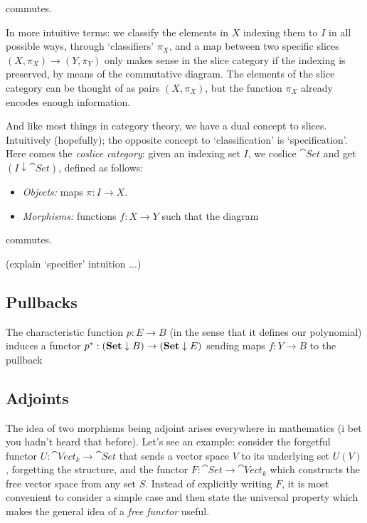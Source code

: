 commutes.

In more intuitive terms: we classify the elements in $X$ indexing them to $I$ in all possible ways, through `classifiers' $\pi_X$, and a map between two specific slices $(X,\pi_X)\to(Y,\pi_Y)$ only makes sense in the slice category if the indexing is preserved, by means of the commutative diagram. The elements of the slice category can be thought of as pairs $(X,\pi_X)$, but the function $\pi_X$ already encodes enough information.

And like most things in category theory, we have a dual concept to slices. Intuitively (hopefully); the opposite concept to `classification' is `specification'. Here comes the \emph{coslice category}: given an indexing set $I$, we coslice $\cat{Set}$ and get $(I\downarrow\cat{Set})$, defined as follows:
\begin{itemize}
\item \emph{Objects:} maps $\pi:I\to X$.
\item \emph{Morphisms:} functions $f:X\to Y$ such that the diagram
\end{itemize}

commutes.

(explain `specifier' intuition ...)

\subsection{Pullbacks}
The characteristic function $p:E\to B$ (in the sense that it defines our polynomial) induces a functor $p^*:(\mathbf{Set}\downarrow B)\to(\mathbf{Set}\downarrow E)$ sending maps $f:Y\to B$ to the pullback


\subsection{Adjoints}
The idea of two morphisms being adjoint arises everywhere in mathematics (i bet you hadn't heard that before). Let's see an example: consider the forgetful functor $U:\cat{Vect_k}\to\cat{Set}$ that sends a vector space $V$ to its underlying set $U(V)$, forgetting the structure, and the functor $F:\cat{Set}\to\cat{Vect_k}$ which constructs the free vector space from any set $S$. Instead of explicitly writing $F$, it is most convenient to consider a simple case and then state the universal property which makes the general idea of a \emph{free functor} useful.

